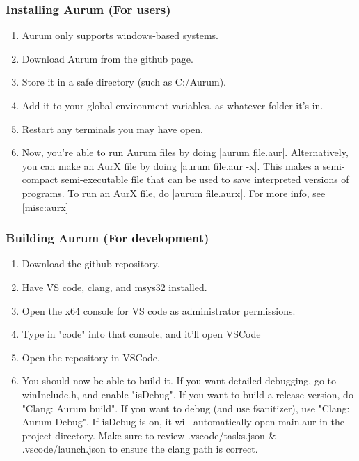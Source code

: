 \documentclass[12pt, letterpaper, oneside]{article}
\begin{document}
		\subsubsection{Installing Aurum (For users)}
		\begin{enumerate}
			\item Aurum only supports windows-based systems.
			\item Download Aurum from the github page.
			\item Store it in a safe directory (such as C:/Aurum).
			\item Add it to your global environment variables. as whatever folder it's in.
			\item Restart any terminals you may have open.
			\item Now, you're able to run Aurum files by doing \spverb|aurum file.aur|. Alternatively, you can make an AurX file by doing \spverb|aurum file.aur -x|. This makes a semi-compact semi-executable file that can be used to save interpreted versions of programs. To run an AurX file, do \spverb|aurum file.aurx|. For more info, see \ref{misc:aurx}
		\end{enumerate}
		\subsubsection{Building Aurum (For development)}
		\begin{enumerate}
			\item Download the github repository.
			\item Have VS code, clang, and msys32 installed.
			\item Open the x64 console for VS code as administrator permissions.
			\item Type in "code" into that console, and it'll open VSCode
			\item Open the repository in VSCode.
			\item You should now be able to build it. If you want detailed debugging, go to winInclude.h, and enable "isDebug". If you want to build a release version, do "Clang: Aurum build". If you want to debug (and use fsanitizer), use "Clang: Aurum Debug". If isDebug is on, it will automatically open main.aur in the project directory. Make sure to review .vscode/tasks.json \& .vscode/launch.json to ensure the clang path is correct.
		\end{enumerate} 
	\newpage
	\setcounter{page}{1}
	\renewcommand{\thepage}{\arabic{page}}
\end{document}
